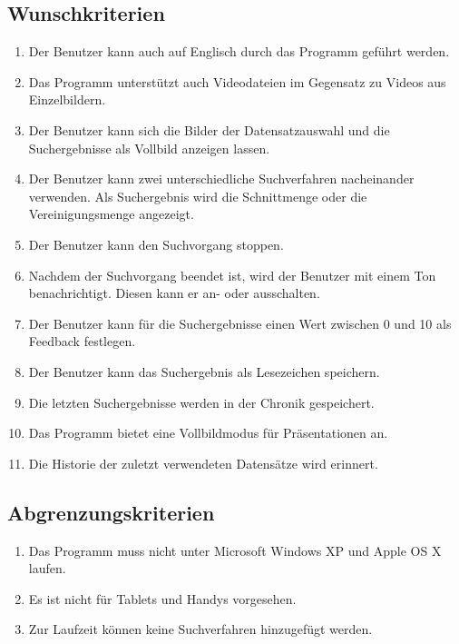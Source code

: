 \subsection{Wunschkriterien}
\begin{enumerate} [label=\bfseries /WK \arabic*0/, leftmargin=*]
\item Der Benutzer kann auch auf Englisch durch das Programm geführt werden.
\item Das Programm unterstützt auch Videodateien im Gegensatz zu Videos aus Einzelbildern.
\item Der Benutzer kann sich die Bilder der Datensatzauswahl und die Suchergebnisse als Vollbild anzeigen lassen.
\item Der Benutzer kann zwei unterschiedliche Suchverfahren nacheinander verwenden. Als Suchergebnis wird die Schnittmenge oder die Vereinigungsmenge angezeigt.
\item Der Benutzer kann den Suchvorgang stoppen.
\item Nachdem der Suchvorgang beendet ist, wird der Benutzer mit einem Ton benachrichtigt. Diesen kann er an- oder ausschalten.
\item Der Benutzer kann für die Suchergebnisse einen Wert zwischen 0 und 10 als Feedback festlegen.
\item Der Benutzer kann das Suchergebnis als Lesezeichen speichern.
\item Die letzten Suchergebnisse werden in der Chronik gespeichert.
\item Das Programm bietet eine Vollbildmodus für Präsentationen an.
\item Die Historie der zuletzt verwendeten Datensätze wird erinnert.
\end{enumerate}
\subsection{Abgrenzungskriterien}
\begin{enumerate} [label=\bfseries /AK \arabic*0/, leftmargin=*]
\item Das Programm muss nicht unter Microsoft Windows XP und Apple OS X laufen. 
\item Es ist nicht für Tablets und Handys vorgesehen.
\item Zur Laufzeit können keine Suchverfahren hinzugefügt werden.
\end{enumerate}
\pagebreak